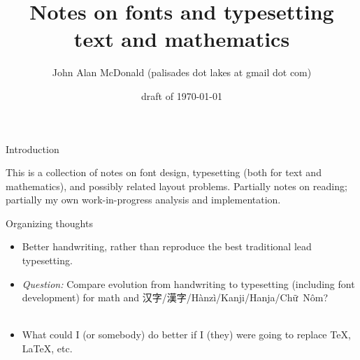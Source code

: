 \documentclass[12pt]{PalisadesLakesBook}
\title{Notes on fonts and typesetting\\ text and mathematics}
\author{John Alan McDonald 
(palisades dot lakes at gmail dot com)}
\date{draft of \today}
\begin{document}
\maketitle
{}
\def\sharedFolder{../../shared/}
\begin{plSection}{Introduction}

This is a collection of notes on font design,
typesetting (both for text and mathematics),
and possibly related layout problems. 
Partially notes on reading; 
partially my own work-in-progress analysis and implementation.
\begin{plSection}{Organizing thoughts}

\begin{itemize}

\item Better handwriting, rather than reproduce the best
traditional lead typesetting.

\item \emph{Question:} Compare evolution from handwriting to 
typesetting (including font development) for
math and 
汉字/\allowbreak 漢字/\allowbreak Hànzì/\allowbreak Kanji/\allowbreak Hanja/\allowbreak \mbox{Chữ Nôm}?\\
\\
 
\item What could I (or somebody) do better
if I (they) were going to replace \TeX, \LaTeX, etc.


\end{itemize}
\end{plSection}%
\end{plSection}%
\end{document}
